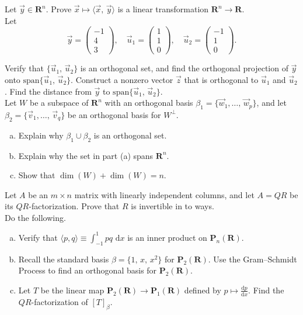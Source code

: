 \documentclass[a4paper,11pt]{article}
\newcommand{\R}{\mathbf{R}}
\newcommand{\PP}{\mathbf{P}}
\begin{document}
 Let $\vec y \in \R^n$. Prove $\vec x \mapsto
\langle \vec x,\,\vec y \rangle$ is a linear transformation $\R^n \rightarrow
\R$. \\

 Let
\[
  \vec y =
  \left(
    \begin{array}{r}
      -1\\4\\3
    \end{array}
  \right), \quad
  \vec u_1 =
  \left(
    \begin{array}{r}
      1\\1\\0
    \end{array}
  \right), \quad
  \vec u_2 =
  \left(
    \begin{array}{r}
      -1\\1\\0
    \end{array}
  \right).
\]

\noindent Verify that $\{\vec u_1,\,\vec u_2\}$ is an orthogonal set, and find
the orthogonal projection of $\vec y$ onto $\text{span}\{\vec u_1,\,\vec u_2\}$.
Construct a nonzero vector $\vec z$ that is orthogonal to $\vec u_1$ and $\vec
u_2$. Find the distance from $\vec y$ to $\text{span}\{\vec u_1,\,\vec u_2\}$.
\\

 Let $W$ be a subspace of $\R^n$ with an orthogonal
basis $\beta_1=\{\vec w_1, \dots,\,\vec w_p\}$, and let $\beta_2=\{\vec
v_1,\dots,\,\vec v_q\}$ be an orthogonal basis for $W^\perp$.
\begin{enumerate}[(a)]
\item Explain why $\beta_1 \cup \beta_2$ is an orthogonal set.
\item Explain why the set in part (a) spans $\R^n$.
\item Show that $\dim(W)+\dim(W)=n$. \\
\end{enumerate}

 Let $A$ be an $m \times n$ matrix with linearly
independent columns, and let $A=QR$ be its $QR$-factorization. Prove that $R$ is
invertible in to ways. \\

 Do the following.
\begin{enumerate}[(a)]
\item Verify that $\langle p,q \rangle \equiv \int_{-1}^1pq\text{ d}x$ is an
  inner product on $\PP_n(\R)$.
\item Recall the standard basis $\beta=\{1,\,x,\,x^2\}$ for $\PP_2(\R)$. Use the
  Gram--Schmidt Process to find an orthogonal basis for $\PP_2(\R)$.
\item Let $T$ be the linear map $\PP_2(\R) \rightarrow \PP_1(\R)$ defined by $p
  \mapsto \frac{\text{d}p}{\text{d}x}$. Find the $QR$-factorization of
  $[T]_\beta$.
\end{enumerate}
\end{document}
